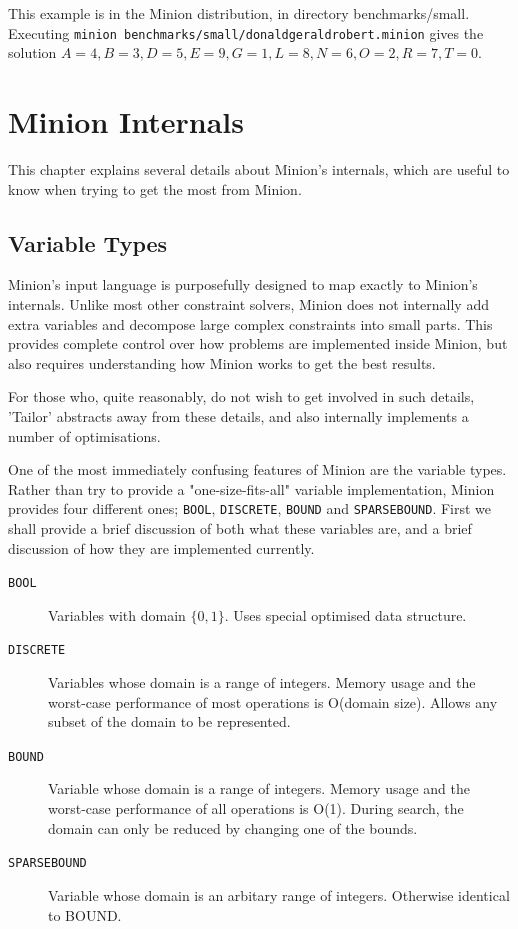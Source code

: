 \documentclass[oneside]{book}
\newcommand{\BOOL}{\texttt{BOOL}\xspace}
\newcommand{\DISCRETE}{\texttt{DISCRETE}\xspace}
\newcommand{\BOUND}{\texttt{BOUND}\xspace}
\newcommand{\SPARSEBOUND}{\texttt{SPARSEBOUND}\xspace}
\begin{document}
This example is in the Minion distribution, in directory benchmarks/small.
Executing \texttt{minion benchmarks/small/donaldgeraldrobert.minion}
gives the solution $A=4, B=3, D=5, E=9, G=1,
L=8, N=6, O=2, R=7, T=0.$

\chapter{Minion Internals}

This chapter explains several details about Minion's internals, which are useful to know when trying to get the most from Minion.

\section{Variable Types}

Minion's input language is purposefully designed to map exactly to Minion's internals. Unlike most other constraint solvers, Minion does not internally add extra variables and decompose large complex constraints into small parts. This provides complete control over how problems are implemented inside Minion, but also requires understanding how Minion works to get the best results.

For those who, quite reasonably, do not wish to get involved in such details, 'Tailor' abstracts away from these details, and also internally implements a number of optimisations.

One of the most immediately confusing features of Minion are the variable types. Rather than try to provide a "one-size-fits-all" variable implementation, Minion provides four different ones; \BOOL, \DISCRETE, \BOUND and \SPARSEBOUND.  First we shall provide a brief discussion of both what these variables are, and a brief discussion of how they are implemented currently.

\begin{description}
\item[\BOOL] Variables with domain \(\{0,1\}\). Uses special optimised data structure.
\item[\DISCRETE] Variables whose domain is a range of integers. Memory usage and the worst-case performance of most operations is O(domain size). Allows any subset of the domain to be represented.
\item[\BOUND] Variable whose domain is a range of integers. Memory usage and the worst-case performance of all operations is O(1). During search, the domain can only be reduced by changing one of the bounds.
\item[\SPARSEBOUND] Variable whose domain is an arbitary range of integers. Otherwise identical to BOUND.
\end{description}
\end{document}
